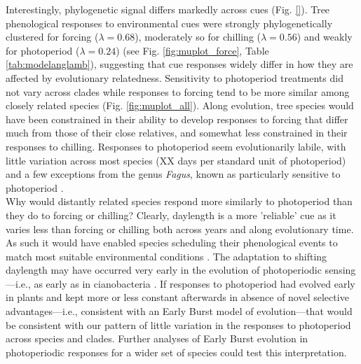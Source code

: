 \documentclass{article}\usepackage[]{graphicx}\usepackage[]{color}
\begin{document}
Interestingly, phylogenetic signal differs markedly across cues (Fig. \ref{}). Tree phenological responses to environmental cues were strongly phylogenetically clustered for forcing ($\lambda = 0.68$), moderately so for chilling ($\lambda = 0.56$) and weakly for photoperiod ($\lambda= 0.24$) (see Fig. \ref{fig:muplot_force}, Table \ref{tab:modelanglamb}), suggesting that cue responses widely differ in how they are affected by evolutionary relatedness. Sensitivity to photoperiod treatments did not vary across clades while responses to forcing tend to be more similar among closely related species (Fig. \ref{fig:muplot_all}). Along evolution, tree species would have been constrained %
in their ability to develop responses to forcing that differ much from those of their close relatives, and somewhat less constrained in their responses to chilling. Responses to photoperiod seem evolutionarily labile, with little variation across most species (XX days per standard unit of photoperiod) and a few exceptions from the genus \emph{Fagus}, known as particularly sensitive to photoperiod \citep{fu2019}.\\ 


Why would distantly related species respond more similarly to photoperiod than they do to forcing or chilling? Clearly, daylength is a more 'reliable' cue as it varies less than forcing or chilling both across years and along evolutionary time. As such it would have enabled species scheduling their phenological events to match most suitable environmental conditions \citep{jackson2009plant}. The adaptation to shifting daylength may have occurred very early in the evolution of photoperiodic sensing---i.e., as early as in cianobacteria \citep{hut2011evolution, serrano2017evolution}. If responses to photoperiod had evolved early in plants and kept more or less constant afterwards in absence of novel selective advantages---i.e., consistent with an Early Burst model of evolution---that would be consistent with our pattern of little variation in the responses to photoperiod across species and clades. Further analyses of Early Burst evolution in photoperiodic responses for a wider set of species could test this interpretation.\\  
\end{document}
